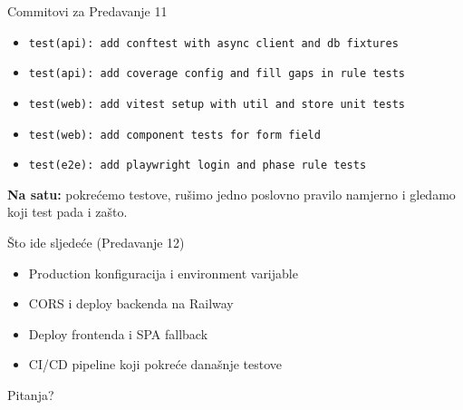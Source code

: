 \begin{frame}{Commitovi za Predavanje 11}
\begin{itemize}
  \item \texttt{test(api): add conftest with async client and db fixtures}
  \item \texttt{test(api): add coverage config and fill gaps in rule tests}
  \item \texttt{test(web): add vitest setup with util and store unit tests}
  \item \texttt{test(web): add component tests for form field}
  \item \texttt{test(e2e): add playwright login and phase rule tests}
\end{itemize}

\vspace{0.4em}
\textbf{Na satu:} pokrećemo testove, rušimo jedno poslovno pravilo namjerno i gledamo koji test pada i zašto.
\end{frame}

\begin{frame}{Što ide sljedeće (Predavanje 12)}
\begin{itemize}
  \item Production konfiguracija i environment varijable
  \item CORS i deploy backenda na Railway
  \item Deploy frontenda i SPA fallback
  \item CI/CD pipeline koji pokreće današnje testove
\end{itemize}

\vspace{0.8em}
\begin{center}
\Large Pitanja?
\end{center}
\end{frame}


